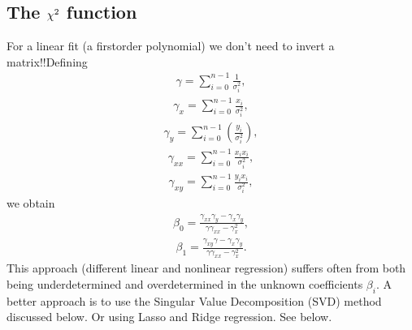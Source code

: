 \documentclass[letterpaper,10pt,english]{sphinxmanual}
\begin{document}
\subsection{The \protect\(\chi^2\protect\) function}
\label{\detokenize{chapter4:id8}}
For a linear fit (a first\sphinxhyphen{}order polynomial) we don’t need to invert a matrix!!Defining
\begin{equation*}
\begin{split}
\gamma =  \sum_{i=0}^{n-1}\frac{1}{\sigma_i^2},
\end{split}
\end{equation*}\begin{equation*}
\begin{split}
\gamma_x =  \sum_{i=0}^{n-1}\frac{x_{i}}{\sigma_i^2},
\end{split}
\end{equation*}\begin{equation*}
\begin{split}
\gamma_y = \sum_{i=0}^{n-1}\left(\frac{y_i}{\sigma_i^2}\right),
\end{split}
\end{equation*}\begin{equation*}
\begin{split}
\gamma_{xx} =  \sum_{i=0}^{n-1}\frac{x_ix_{i}}{\sigma_i^2},
\end{split}
\end{equation*}\begin{equation*}
\begin{split}
\gamma_{xy} = \sum_{i=0}^{n-1}\frac{y_ix_{i}}{\sigma_i^2},
\end{split}
\end{equation*}
we obtain
\begin{equation*}
\begin{split}
\beta_0 = \frac{\gamma_{xx}\gamma_y-\gamma_x\gamma_y}{\gamma\gamma_{xx}-\gamma_x^2},
\end{split}
\end{equation*}\begin{equation*}
\begin{split}
\beta_1 = \frac{\gamma_{xy}\gamma-\gamma_x\gamma_y}{\gamma\gamma_{xx}-\gamma_x^2}.
\end{split}
\end{equation*}
This approach (different linear and non\sphinxhyphen{}linear regression) suffers
often from both being underdetermined and overdetermined in the
unknown coefficients \(\beta_i\).  A better approach is to use the
Singular Value Decomposition (SVD) method discussed below. Or using
Lasso and Ridge regression. See below.
\end{document}
